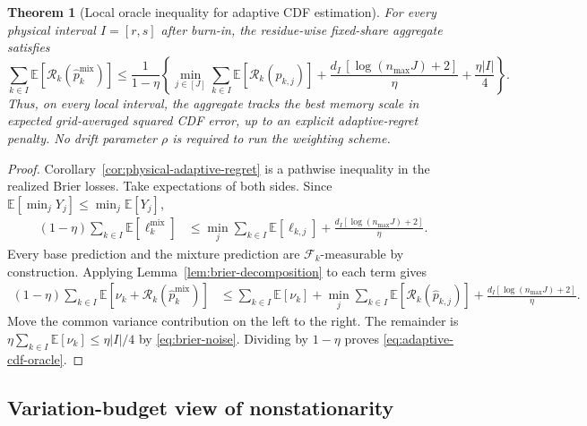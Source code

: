 \documentclass[11pt]{article}
\newtheorem{theorem}{Theorem}
\newcommand{\E}{\mathbb{E}}
\newcommand{\F}{\mathcal{F}}
\newcommand{\1}{\mathbf{1}}
\begin{document}
\begin{theorem}[Local oracle inequality for adaptive CDF estimation]
\label{thm:adaptive-cdf-oracle}
For every physical interval $I=[r,s]$ after burn-in, the residue-wise
fixed-share aggregate satisfies
\begin{equation}
\boxed{
    \sum_{k\in I}
    \E\!\left[
        \mathcal R_k(\widehat p_k^{\mathrm{mix}})
    \right]
    \le
    \frac1{1-\eta}
    \left
    \{
        \min_{j\in[J]}
        \sum_{k\in I}
        \E\!\left[
            \mathcal R_k(\widehat p_{k,j})
        \right]
        +
        \frac{d_I\,[\log(n_{\max}J)+2]}{\eta}
        +
        \frac{\eta|I|}{4}
    \right\}.
}
\label{eq:adaptive-cdf-oracle}
\end{equation}
Thus, on every local interval, the aggregate tracks the best memory scale in
expected grid-averaged squared CDF error, up to an explicit adaptive-regret
penalty.  No drift parameter $\rho$ is required to run the weighting scheme.
\end{theorem}

\begin{proof}
Corollary~\ref{cor:physical-adaptive-regret} is a pathwise inequality in the
realized Brier losses.  Take expectations of both sides.  Since
$\E[\min_j Y_j]\le\min_j\E[Y_j]$,
\begin{align*}
    (1-\eta)
    \sum_{k\in I}\E[\ell_k^{\mathrm{mix}}]
    &\le
    \min_j
    \sum_{k\in I}\E[\ell_{k,j}]
    +
    \frac{d_I[\log(n_{\max}J)+2]}{\eta}.
\end{align*}
Every base prediction and the mixture prediction are $\F_k$-measurable by
construction.  Applying Lemma~\ref{lem:brier-decomposition} to each term gives
\begin{align*}
    (1-\eta)
    \sum_{k\in I}
    \E[\nu_k+\mathcal R_k(\widehat p_k^{\mathrm{mix}})]
    &\le
    \sum_{k\in I}\E[\nu_k]
    +
    \min_j
    \sum_{k\in I}
    \E[\mathcal R_k(\widehat p_{k,j})]
    +
    \frac{d_I[\log(n_{\max}J)+2]}{\eta}.
\end{align*}
Move the common variance contribution on the left to the right.  The remainder
is $\eta\sum_{k\in I}\E[\nu_k]\le\eta|I|/4$ by
\eqref{eq:brier-noise}.  Dividing by $1-\eta$ proves
\eqref{eq:adaptive-cdf-oracle}.
\end{proof}


\subsection{Variation-budget view of nonstationarity}
\label{subsec:variation-budget}
\end{document}
